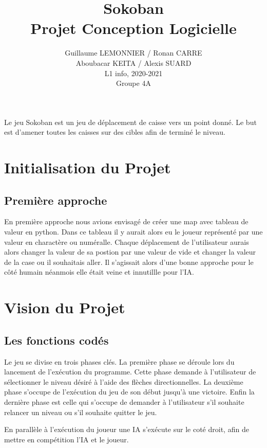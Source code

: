 \documentclass[a4paper,12pt]{article} %
\author{Guillaume LEMONNIER / Ronan CARRE\\Aboubacar KEITA / Alexis SUARD\\L1 info, 2020-2021\\Groupe 4A}
\title{Sokoban\\Projet Conception Logicielle}
\begin{document}
\maketitle

Le jeu Sokoban est un jeu de déplacement de caisse vers un point donné.
Le but est d'amener toutes les caisses sur des cibles afin de terminé le niveau.

\tableofcontents

\newpage

\section{Initialisation du Projet}

\subsection{Première approche}

En première approche nous avions envisagé de créer une map avec tableau de valeur en python.
Dans ce tableau il y aurait alors eu le joueur représenté par une valeur en charactère ou numéralle.
Chaque déplacement de l'utilisateur aurais alors changer la valeur de sa postion par une valeur de vide et changer la valeur de la case ou il souhaitais aller.
Il s'agissait alors d'une bonne approche pour le côté humain néanmois elle était veine et innutillle pour l'IA.

\newpage

\section{Vision du Projet}

\subsection{Les fonctions codés}

Le jeu se divise en trois phases clés.
La première phase se déroule lors du lancement de l'exécution du programme.
Cette phase demande à l'utilisateur de sélectionner le niveau désiré à l'aide des flèches directionnelles.
La deuxième phase s'occupe de l'exécution du jeu de son début jusqu'à une victoire.
Enfin la dernière phase est celle qui s'occupe de demander à l'utilisateur s'il souhaite relancer un niveau ou s'il souhaite quitter le jeu.

En parallèle à l'exécution du joueur une IA s'exécute  sur le coté droit, afin de mettre en compétition l'IA et le joueur.
\end{document}
